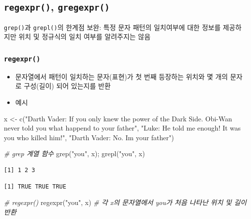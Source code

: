 \documentclass[
  11pt,
]{krantz}
\newenvironment{Shaded}{\begin{snugshade}}{\end{snugshade}}
\newcommand{\CommentTok}[1]{\textcolor[rgb]{0.37,0.37,0.37}{\textit{#1}}}
\newcommand{\FunctionTok}[1]{\textcolor[rgb]{0,0,0}{#1}}
\newcommand{\NormalTok}[1]{#1}
\newcommand{\OtherTok}[1]{\textcolor[rgb]{0.37,0.37,0.37}{#1}}
\newcommand{\StringTok}[1]{\textcolor[rgb]{0.5,0.5,0.5}{#1}}
\providecommand{\tightlist}{%
  \setlength{\itemsep}{0pt}\setlength{\parskip}{0pt}}
\begin{document}
\normalsize

\hypertarget{regexpr-gregexpr}{%
\subsection{\texorpdfstring{\textbf{\texttt{regexpr()}}, \textbf{\texttt{gregexpr()}}}{regexpr(), gregexpr()}}\label{regexpr-gregexpr}}

\texttt{grep()}과 \texttt{grepl()}의 한계점 보완: 특정 문자 패턴의 일치여부에 대한 정보를 제공하지만 위치 및 정규식의 일치 여부를 알려주지는 않음

\hypertarget{regexpr}{%
\subsubsection*{\texorpdfstring{\textbf{\texttt{regexpr()}}}{regexpr()}}\label{regexpr}}


\begin{itemize}
\tightlist
\item
  문자열에서 패턴이 일치하는 문자(표현)가 첫 번째 등장하는 위치와 몇 개의 문자로 구성(길이) 되어 있는지를 반환
\item
  예시
\end{itemize}

\footnotesize

\begin{Shaded}
\begin{Highlighting}[]
\NormalTok{x }\OtherTok{\textless{}{-}} \FunctionTok{c}\NormalTok{(}\StringTok{"Darth Vader: If you only knew the power of the Dark Side. }
\StringTok{       Obi{-}Wan never told you what happend to your father"}\NormalTok{, }
       \StringTok{"Luke: He told me enough! It was you who killed him!"}\NormalTok{, }
       \StringTok{"Darth Vader: No. I\textquotesingle{}m your father"}\NormalTok{)}

\CommentTok{\# grep 계열 함수}
\FunctionTok{grep}\NormalTok{(}\StringTok{"you"}\NormalTok{, x); }\FunctionTok{grepl}\NormalTok{(}\StringTok{"you"}\NormalTok{, x)}
\end{Highlighting}
\end{Shaded}

\begin{verbatim}
[1] 1 2 3
\end{verbatim}

\begin{verbatim}
[1] TRUE TRUE TRUE
\end{verbatim}

\begin{Shaded}
\begin{Highlighting}[]
\CommentTok{\# regexpr() }
\FunctionTok{regexpr}\NormalTok{(}\StringTok{"you"}\NormalTok{, x) }\CommentTok{\# 각 x의 문자열에서 you가 처음 나타난 위치 및 길이 반환}
\end{Highlighting}
\end{Shaded}
\end{document}
